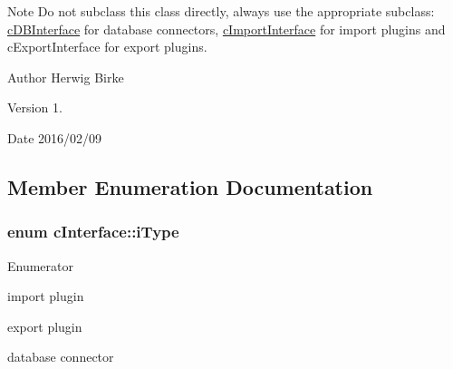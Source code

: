 \begin{DoxyNote}{Note}
Do not subclass this class directly, always use the appropriate subclass\+: \hyperlink{classc_d_b_interface}{c\+D\+B\+Interface} for database connectors, \hyperlink{classc_import_interface}{c\+Import\+Interface} for import plugins and c\+Export\+Interface for export plugins.
\end{DoxyNote}
\begin{DoxyAuthor}{Author}
Herwig Birke
\end{DoxyAuthor}
\begin{DoxyVersion}{Version}
1.
\end{DoxyVersion}
\begin{DoxyDate}{Date}
2016/02/09 
\end{DoxyDate}


\subsection{Member Enumeration Documentation}
\subsubsection[{\texorpdfstring{i\+Type}{iType}}]{\setlength{\rightskip}{0pt plus 5cm}enum {\bf c\+Interface\+::i\+Type}}\hypertarget{classc_interface_a41462a3131755963add9ba3026e7d31a}{}\label{classc_interface_a41462a3131755963add9ba3026e7d31a}
\begin{Desc}
\item[Enumerator]\par
\begin{description}
\item[{\em 
i\+Type\+Import\hypertarget{classc_interface_a41462a3131755963add9ba3026e7d31aa493982726026a437f9042749a76f456a}{}\label{classc_interface_a41462a3131755963add9ba3026e7d31aa493982726026a437f9042749a76f456a}
}]import plugin \item[{\em 
i\+Type\+Export\hypertarget{classc_interface_a41462a3131755963add9ba3026e7d31aa4b8e5dcb2c471b3fb96ea37d8263612f}{}\label{classc_interface_a41462a3131755963add9ba3026e7d31aa4b8e5dcb2c471b3fb96ea37d8263612f}
}]export plugin \item[{\em 
i\+Type\+DB\hypertarget{classc_interface_a41462a3131755963add9ba3026e7d31aa242858255f85f84d2c9791f376bf738a}{}\label{classc_interface_a41462a3131755963add9ba3026e7d31aa242858255f85f84d2c9791f376bf738a}
}]database connector \end{description}
\end{Desc}


